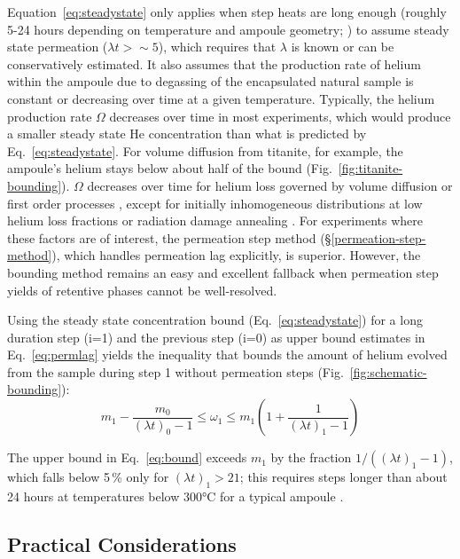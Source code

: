 Equation~\eqref{eq:steadystate} only applies when step heats are long enough (roughly 5-24 hours depending on temperature and ampoule geometry; \citealp{thyer2026thesis}) to assume steady state permeation (\(\lambda t > \sim 5\)), which requires that \(\lambda\) is known or can be conservatively estimated. It also assumes that the production rate of helium within the ampoule due to degassing of the encapsulated natural sample is constant or decreasing over time at a given temperature. Typically, the helium production rate \(\Omega\) decreases over time in most experiments, which would produce a smaller steady state He concentration than what is predicted by Eq.~\eqref{eq:steadystate}. For volume diffusion from titanite, for example, the ampoule's helium stays below about half of the bound (Fig.~\ref{fig:titanite-bounding}). \(\Omega\) decreases over time for helium loss governed by volume diffusion \citep{wolf1996,reinersfarley1999} or first order processes \citep{yakubovich2010}, except for initially inhomogeneous distributions at low helium loss fractions \citep{farley1996,shuster2004} or radiation damage annealing \citep{shuster2006,flowers2009}. For experiments where these factors are of interest, the permeation step method (\S\ref{permeation-step-method}), which handles permeation lag explicitly, is superior. However, the bounding method remains an easy and excellent fallback when permeation step yields of retentive phases cannot be well-resolved.

Using the steady state concentration bound (Eq.~\eqref{eq:steadystate}) for a long duration step (i=1) and the previous step (i=0) as upper bound estimates in Eq.~\eqref{eq:permlag} yields the inequality that bounds the amount of helium evolved from the sample during step 1 without permeation steps (Fig.~\ref{fig:schematic-bounding}):\emph{\hfill\break
}\begin{equation}
\label{eq:bound}
m_{1} - \frac{m_{0}}{(\lambda t)_{0} - 1} \leq \omega_{1} \leq m_{1}\left( 1 + \frac{1}{(\lambda t)_{1} - 1} \right)
\end{equation}

The upper bound in Eq.~\eqref{eq:bound} exceeds \(m_1\) by the fraction \(1/((\lambda t)_1 - 1)\), which falls below 5\,\% only for \((\lambda t)_1 > 21\); this requires steps longer than about 24 hours at temperatures below 300°C for a typical ampoule \citep{thyer2026thesis}.

\subsection{Practical Considerations}\label{sec:practical}

